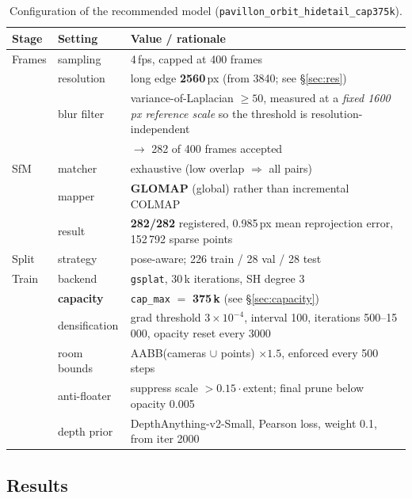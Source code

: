 \begin{table}[h]
\centering\small
\begin{tabular}{llp{7.2cm}}
\toprule
Stage & Setting & Value / rationale \\
\midrule
Frames & sampling & 4\,fps, capped at 400 frames \\
       & resolution & long edge \textbf{2560}\,px (from 3840; see \S\ref{sec:res}) \\
       & blur filter & variance-of-Laplacian $\geq 50$, measured at a \emph{fixed
                       1600\,px reference scale} so the threshold is
                       resolution-independent \\
       &             & $\rightarrow$ 282 of 400 frames accepted \\
\midrule
SfM    & matcher & exhaustive (low overlap $\Rightarrow$ all pairs) \\
       & mapper  & \textbf{GLOMAP} (global) rather than incremental COLMAP \\
       & result  & \textbf{282/282} registered, 0.985\,px mean reprojection error,
                   152\,792 sparse points \\
\midrule
Split  & strategy & pose-aware; 226 train / 28 val / 28 test \\
\midrule
Train  & backend & \texttt{gsplat}, 30\,k iterations, SH degree 3 \\
       & \textbf{capacity} & \texttt{cap\_max} $=$ \textbf{375\,k} (see \S\ref{sec:capacity}) \\
       & densification & grad threshold $3\times10^{-4}$, interval 100,
                         iterations 500--15\,000, opacity reset every 3000 \\
       & room bounds & AABB(cameras $\cup$ points) $\times1.5$, enforced every 500 steps \\
       & anti-floater & suppress scale $>0.15\cdot$extent; final prune below
                        opacity 0.005 \\
       & depth prior & DepthAnything-v2-Small, Pearson loss, weight 0.1, from iter 2000 \\
\bottomrule
\end{tabular}
\caption{Configuration of the recommended model (\texttt{pavillon\_orbit\_hidetail\_cap375k}).}
\label{tab:settings}
\end{table}

\subsection{Results}

